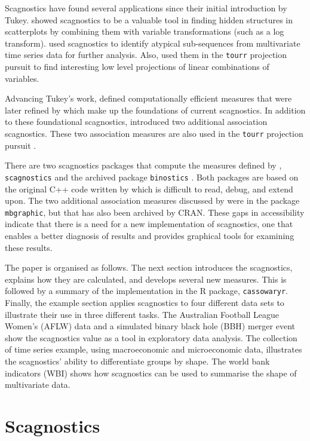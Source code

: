 Scagnostics have found several applications since their initial introduction by Tukey. \citet{hidscags} showed scagnostics to be a valuable tool in finding hidden structures in scatterplots by combining them with variable transformations (such as a log transform). \citet{timeseer} used scagnostics to identify atypical sub-sequences from multivariate time series data for further analysis. Also, \citet{tourrpp} used them in the \texttt{tourr} projection pursuit to find interesting low level projections of linear combinations of variables.

Advancing Tukey's work, \citet{scag} defined computationally efficient measures that were later refined by \citet{scagdist} which make up the foundations of current scagnostics. In addition to these foundational scagnostics, \citet{Grimm} introduced two additional association scagnostics. These two association measures are also used in the \texttt{tourr} projection pursuit \citep{tourrpp}.

There are two scagnostics packages that compute the measures defined by \citet{scag}, \texttt{scagnostics} \citep{scagdist} and the archived package \texttt{binostics} \citep{binostics}. Both packages are based on the original C++ code written by \citet{scagdist} which is difficult to read, debug, and extend upon. The two additional association measures discussed by \citet{Grimm} were in the package \texttt{mbgraphic}, but that has also been archived by CRAN. These gaps in accessibility indicate that there is a need for a new implementation of scagnostics, one that enables a better diagnosis of results and provides graphical tools for examining these results.

The paper is organised as follows. The next section introduces the scagnostics, explains how they are calculated, and develops several new measures. This is followed by a summary of the implementation in the R package, \texttt{cassowaryr}. Finally, the example section applies scagnostics to four different data sets to illustrate their use in three different tasks. The Australian Football League Women's (AFLW) data and a simulated binary black hole (BBH) merger event show the scagnostics value as a tool in exploratory data analysis. The collection of time series example, using macroeconomic and microeconomic data, illustrates the scagnostics' ability to differentiate groups by shape. The world bank indicators (WBI) shows how scagnostics can be used to summarise the shape of multivariate data.

\section{Scagnostics}\label{scagnostics}

